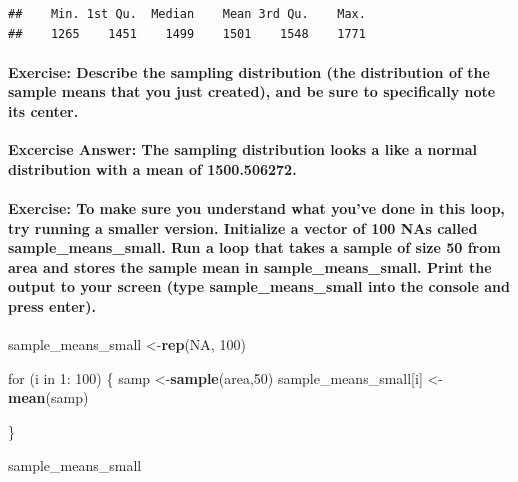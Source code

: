\documentclass[]{article}
\newenvironment{Shaded}{\begin{snugshade}}{\end{snugshade}}
\newcommand{\KeywordTok}[1]{\textcolor[rgb]{0.13,0.29,0.53}{\textbf{{#1}}}}
\newcommand{\DecValTok}[1]{\textcolor[rgb]{0.00,0.00,0.81}{{#1}}}
\newcommand{\StringTok}[1]{\textcolor[rgb]{0.31,0.60,0.02}{{#1}}}
\newcommand{\OtherTok}[1]{\textcolor[rgb]{0.56,0.35,0.01}{{#1}}}
\newcommand{\NormalTok}[1]{{#1}}
\begin{document}
\begin{verbatim}
##    Min. 1st Qu.  Median    Mean 3rd Qu.    Max. 
##    1265    1451    1499    1501    1548    1771
\end{verbatim}

\paragraph{Exercise: Describe the sampling distribution (the
distribution of the sample means that you just created), and be sure to
specifically note its
center.}\label{exercise-describe-the-sampling-distribution-the-distribution-of-the-sample-means-that-you-just-created-and-be-sure-to-specifically-note-its-center.}

\textbf{Excercise Answer: The sampling distribution looks a like a
normal distribution with a mean of 1500.506272.}

\paragraph{Exercise: To make sure you understand what you've done in
this loop, try running a smaller version. Initialize a vector of 100 NAs
called sample\_means\_small. Run a loop that takes a sample of size 50
from area and stores the sample mean in sample\_means\_small. Print the
output to your screen (type sample\_means\_small into the console and
press
enter).}\label{exercise-to-make-sure-you-understand-what-youve-done-in-this-loop-try-running-a-smaller-version.-initialize-a-vector-of-100-nas-called-sampleux5fmeansux5fsmall.-run-a-loop-that-takes-a-sample-of-size-50-from-area-and-stores-the-sample-mean-in-sampleux5fmeansux5fsmall.-print-the-output-to-your-screen-type-sampleux5fmeansux5fsmall-into-the-console-and-press-enter.}

\begin{Shaded}
\begin{Highlighting}[]
\NormalTok{sample_means_small <-}\KeywordTok{rep}\NormalTok{(}\OtherTok{NA}\NormalTok{, }\DecValTok{100}\NormalTok{)}

\NormalTok{for (i in }\DecValTok{1}\NormalTok{:}\StringTok{ }\DecValTok{100}\NormalTok{)}
\NormalTok{\{}
     \NormalTok{samp <-}\KeywordTok{sample}\NormalTok{(area,}\DecValTok{50}\NormalTok{)}
     \NormalTok{sample_means_small[i] <-}\KeywordTok{mean}\NormalTok{(samp)}
    
\NormalTok{\}}

\NormalTok{sample_means_small}
\end{Highlighting}
\end{Shaded}
\end{document}
